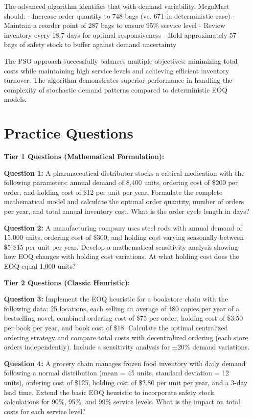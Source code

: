 \documentclass{article}
\begin{document}
The advanced algorithm identifies that with demand variability, MegaMart should:
- Increase order quantity to 748 bags (vs. 671 in deterministic case)
- Maintain a reorder point of 287 bags to ensure 95\% service level
- Review inventory every 18.7 days for optimal responsiveness
- Hold approximately 57 bags of safety stock to buffer against demand uncertainty

The PSO approach successfully balances multiple objectives: minimizing total costs while maintaining high service levels and achieving efficient inventory turnover. The algorithm demonstrates superior performance in handling the complexity of stochastic demand patterns compared to deterministic EOQ models.

\section{Practice Questions}

\textbf{Tier 1 Questions (Mathematical Formulation):}

\textbf{Question 1:} A pharmaceutical distributor stocks a critical medication with the following parameters: annual demand of 8,400 units, ordering cost of \$200 per order, and holding cost of \$12 per unit per year. Formulate the complete mathematical model and calculate the optimal order quantity, number of orders per year, and total annual inventory cost. What is the order cycle length in days?

\textbf{Question 2:} A manufacturing company uses steel rods with annual demand of 15,000 units, ordering cost of \$300, and holding cost varying seasonally between \$5-\$15 per unit per year. Develop a mathematical sensitivity analysis showing how EOQ changes with holding cost variations. At what holding cost does the EOQ equal 1,000 units?

\textbf{Tier 2 Questions (Classic Heuristic):}

\textbf{Question 3:} Implement the EOQ heuristic for a bookstore chain with the following data: 25 locations, each selling an average of 480 copies per year of a bestselling novel, combined ordering cost of \$75 per order, holding cost of \$3.50 per book per year, and book cost of \$18. Calculate the optimal centralized ordering strategy and compare total costs with decentralized ordering (each store orders independently). Include a sensitivity analysis for ±20\% demand variations.

\textbf{Question 4:} A grocery chain manages frozen food inventory with daily demand following a normal distribution (mean = 45 units, standard deviation = 12 units), ordering cost of \$125, holding cost of \$2.80 per unit per year, and a 3-day lead time. Extend the basic EOQ heuristic to incorporate safety stock calculations for 90\%, 95\%, and 99\% service levels. What is the impact on total costs for each service level?
\end{document}
